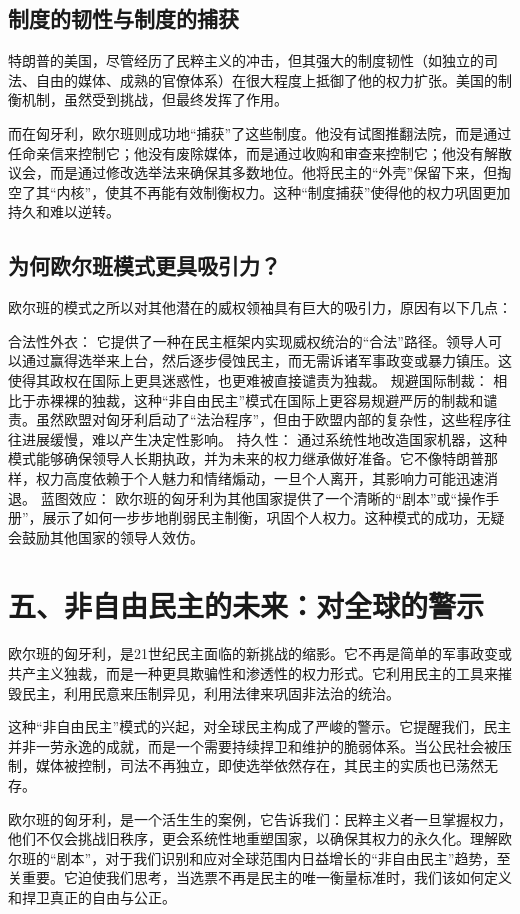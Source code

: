 \subsection{制度的韧性与制度的捕获}

特朗普的美国，尽管经历了民粹主义的冲击，但其强大的制度韧性（如独立的司法、自由的媒体、成熟的官僚体系）在很大程度上抵御了他的权力扩张。美国的制衡机制，虽然受到挑战，但最终发挥了作用。

而在匈牙利，欧尔班则成功地“捕获”了这些制度。他没有试图推翻法院，而是通过任命亲信来控制它；他没有废除媒体，而是通过收购和审查来控制它；他没有解散议会，而是通过修改选举法来确保其多数地位。他将民主的“外壳”保留下来，但掏空了其“内核”，使其不再能有效制衡权力。这种“制度捕获”使得他的权力巩固更加持久和难以逆转。

\subsection{为何欧尔班模式更具吸引力？}

欧尔班的模式之所以对其他潜在的威权领袖具有巨大的吸引力，原因有以下几点：

合法性外衣： 它提供了一种在民主框架内实现威权统治的“合法”路径。领导人可以通过赢得选举来上台，然后逐步侵蚀民主，而无需诉诸军事政变或暴力镇压。这使得其政权在国际上更具迷惑性，也更难被直接谴责为独裁。
规避国际制裁： 相比于赤裸裸的独裁，这种“非自由民主”模式在国际上更容易规避严厉的制裁和谴责。虽然欧盟对匈牙利启动了“法治程序”，但由于欧盟内部的复杂性，这些程序往往进展缓慢，难以产生决定性影响。
持久性： 通过系统性地改造国家机器，这种模式能够确保领导人长期执政，并为未来的权力继承做好准备。它不像特朗普那样，权力高度依赖于个人魅力和情绪煽动，一旦个人离开，其影响力可能迅速消退。
蓝图效应： 欧尔班的匈牙利为其他国家提供了一个清晰的“剧本”或“操作手册”，展示了如何一步步地削弱民主制衡，巩固个人权力。这种模式的成功，无疑会鼓励其他国家的领导人效仿。

\section{五、非自由民主的未来：对全球的警示}

欧尔班的匈牙利，是21世纪民主面临的新挑战的缩影。它不再是简单的军事政变或共产主义独裁，而是一种更具欺骗性和渗透性的权力形式。它利用民主的工具来摧毁民主，利用民意来压制异见，利用法律来巩固非法治的统治。

这种“非自由民主”模式的兴起，对全球民主构成了严峻的警示。它提醒我们，民主并非一劳永逸的成就，而是一个需要持续捍卫和维护的脆弱体系。当公民社会被压制，媒体被控制，司法不再独立，即使选举依然存在，其民主的实质也已荡然无存。

欧尔班的匈牙利，是一个活生生的案例，它告诉我们：民粹主义者一旦掌握权力，他们不仅会挑战旧秩序，更会系统性地重塑国家，以确保其权力的永久化。理解欧尔班的“剧本”，对于我们识别和应对全球范围内日益增长的“非自由民主”趋势，至关重要。它迫使我们思考，当选票不再是民主的唯一衡量标准时，我们该如何定义和捍卫真正的自由与公正。